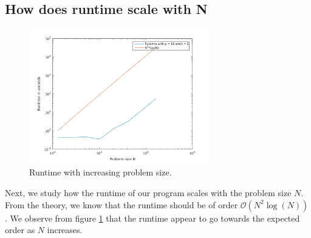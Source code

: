 \subsection*{How does runtime scale with N}
\begin{figure}[h!]
			\centering
			\includegraphics[width=0.7\textwidth]{./figures/runtimeN}
			\caption{Runtime with increasing problem size.}
			\label{fig:runtimeN}
\end{figure}
Next, we study how the runtime of our program scales with the problem size $N$. From the theory, we know that the runtime should be of order $\mathcal{O}(N^2\log(N))$. We observe from figure \ref{fig:runtimeN} that the runtime appear to go towards the expected order as $N$ increases.
